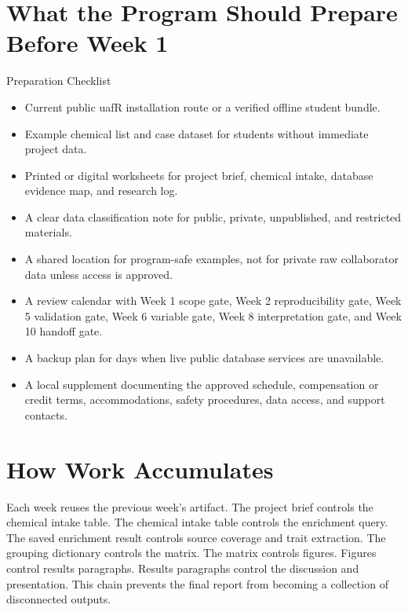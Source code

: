 \section{What the Program Should Prepare Before Week 1}
\begin{checklistbox}{Preparation Checklist}
\begin{itemize}
  \item Current public uafR installation route or a verified offline student bundle.
  \item Example chemical list and case dataset for students without immediate project data.
  \item Printed or digital worksheets for project brief, chemical intake, database evidence map, and research log.
  \item A clear data classification note for public, private, unpublished, and restricted materials.
  \item A shared location for program-safe examples, not for private raw collaborator data unless access is approved.
  \item A review calendar with Week 1 scope gate, Week 2 reproducibility gate, Week 5 validation gate, Week 6 variable gate, Week 8 interpretation gate, and Week 10 handoff gate.
  \item A backup plan for days when live public database services are unavailable.
  \item A local supplement documenting the approved schedule, compensation or credit terms, accommodations, safety procedures, data access, and support contacts.
\end{itemize}
\end{checklistbox}

\section{How Work Accumulates}
Each week reuses the previous week's artifact. The project brief controls the chemical intake table. The chemical intake table controls the enrichment query. The saved enrichment result controls source coverage and trait extraction. The grouping dictionary controls the matrix. The matrix controls figures. Figures control results paragraphs. Results paragraphs control the discussion and presentation. This chain prevents the final report from becoming a collection of disconnected outputs.
